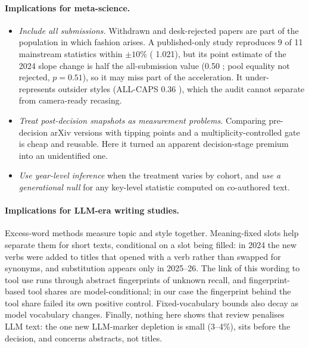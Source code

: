 \paragraph{Implications for meta-science.}
\begin{itemize}
\item \emph{Include all submissions.} Withdrawn and desk-rejected papers are part of the population in which fashion arises. A published-only study reproduces 9 of 11 mainstream statistics within $\pm 10\%$ (\NAME{} 1.021), but its point estimate of the 2024 \NAME{} slope change is half the all-submission value (0.50 ; pool equality not rejected, $p=0.51$), so it may miss part of the acceleration. It under-represents outsider styles (ALL-CAPS 0.36 ), which the audit cannot separate from camera-ready recasing.
\item \emph{Treat post-decision snapshots as measurement problems.} Comparing pre-decision arXiv versions with tipping points and a multiplicity-controlled gate is cheap and reusable. Here it turned an apparent decision-stage premium into an unidentified one.
\item \emph{Use year-level inference} when the treatment varies by cohort, and \emph{use a generational null} for any key-level statistic computed on co-authored text.
\end{itemize}

\paragraph{Implications for LLM-era writing studies.}
Excess-word methods \citep{kobak2025delving,liang2025quantifying} measure topic and style together. Meaning-fixed slots help separate them for short texts, conditional on a slot being filled: in 2024 the new verbs were added to titles that opened with a verb rather than swapped for synonyms, and substitution appears only in 2025--26. The link of this wording to tool use runs through abstract fingerprints of unknown recall, and fingerprint-based tool shares are model-conditional; in our case the fingerprint behind the tool share failed its own positive control. Fixed-vocabulary bounds also decay as model vocabulary changes. Finally, nothing here shows that review penalises LLM text: the one new LLM-marker depletion is small (3--4\%), sits before the decision, and concerns abstracts, not titles.
